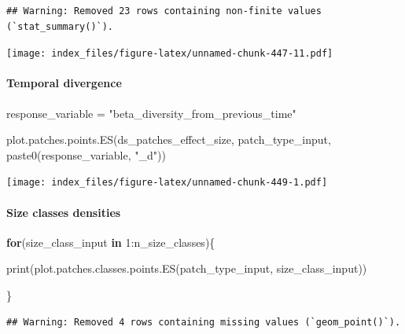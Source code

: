 \documentclass[
]{article}
\newenvironment{Shaded}{\begin{snugshade}}{\end{snugshade}}
\newcommand{\ControlFlowTok}[1]{\textcolor[rgb]{0.13,0.29,0.53}{\textbf{#1}}}
\newcommand{\DecValTok}[1]{\textcolor[rgb]{0.00,0.00,0.81}{#1}}
\newcommand{\FunctionTok}[1]{\textcolor[rgb]{0.00,0.00,0.00}{#1}}
\newcommand{\NormalTok}[1]{#1}
\newcommand{\OtherTok}[1]{\textcolor[rgb]{0.56,0.35,0.01}{#1}}
\newcommand{\SpecialCharTok}[1]{\textcolor[rgb]{0.00,0.00,0.00}{#1}}
\newcommand{\StringTok}[1]{\textcolor[rgb]{0.31,0.60,0.02}{#1}}
\begin{document}
\begin{verbatim}
## Warning: Removed 23 rows containing non-finite values (`stat_summary()`).
\end{verbatim}

\texttt{[image: index\_files/figure-latex/unnamed-chunk-447-11.pdf]}

\hypertarget{temporal-divergence-2}{%
\paragraph{Temporal divergence}\label{temporal-divergence-2}}

\begin{Shaded}
\begin{Highlighting}[]
\NormalTok{response\_variable }\OtherTok{=} \StringTok{"beta\_diversity\_from\_previous\_time"}
\end{Highlighting}
\end{Shaded}

\begin{Shaded}
\begin{Highlighting}[]
\FunctionTok{plot.patches.points.ES}\NormalTok{(ds\_patches\_effect\_size, patch\_type\_input,}
                       \FunctionTok{paste0}\NormalTok{(response\_variable, }\StringTok{"\_d"}\NormalTok{))}
\end{Highlighting}
\end{Shaded}

\texttt{[image: index\_files/figure-latex/unnamed-chunk-449-1.pdf]}

\hypertarget{size-classes-densities-3}{%
\paragraph{Size classes densities}\label{size-classes-densities-3}}

\begin{Shaded}
\begin{Highlighting}[]
\ControlFlowTok{for}\NormalTok{(size\_class\_input }\ControlFlowTok{in} \DecValTok{1}\SpecialCharTok{:}\NormalTok{n\_size\_classes)\{}
  
  \FunctionTok{print}\NormalTok{(}\FunctionTok{plot.patches.classes.points.ES}\NormalTok{(patch\_type\_input,}
\NormalTok{                                       size\_class\_input))}
  
\NormalTok{\}}
\end{Highlighting}
\end{Shaded}

\begin{verbatim}
## Warning: Removed 4 rows containing missing values (`geom_point()`).
\end{verbatim}
\end{document}
